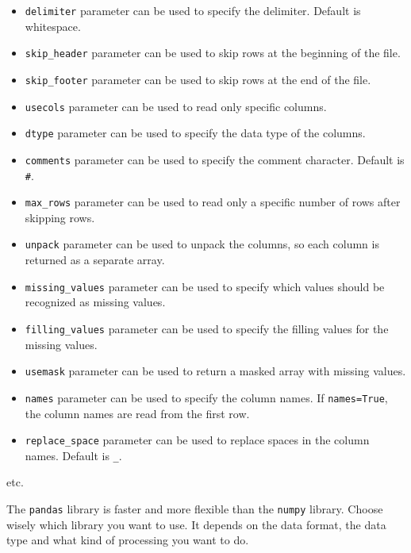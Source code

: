 \documentclass[
  letterpaper,
  DIV=11,
  numbers=noendperiod]{scrreprt}
\begin{document}
\begin{itemize}
\item
  \texttt{delimiter} parameter can be used to specify the delimiter.
  Default is whitespace.
\item
  \texttt{skip\_header} parameter can be used to skip rows at the
  beginning of the file.
\item
  \texttt{skip\_footer} parameter can be used to skip rows at the end of
  the file.
\item
  \texttt{usecols} parameter can be used to read only specific columns.
\item
  \texttt{dtype} parameter can be used to specify the data type of the
  columns.
\item
  \texttt{comments} parameter can be used to specify the comment
  character. Default is \texttt{\#}.
\item
  \texttt{max\_rows} parameter can be used to read only a specific
  number of rows after skipping rows.
\item
  \texttt{unpack} parameter can be used to unpack the columns, so each
  column is returned as a separate array.
\item
  \texttt{missing\_values} parameter can be used to specify which values
  should be recognized as missing values.
\item
  \texttt{filling\_values} parameter can be used to specify the filling
  values for the missing values.
\item
  \texttt{usemask} parameter can be used to return a masked array with
  missing values.
\item
  \texttt{names} parameter can be used to specify the column names. If
  \texttt{names=True}, the column names are read from the first row.
\item
  \texttt{replace\_space} parameter can be used to replace spaces in the
  column names. Default is \texttt{\_}.
\end{itemize}

etc.

\begin{tcolorbox}[enhanced jigsaw, leftrule=.75mm, bottomrule=.15mm, colbacktitle=quarto-callout-important-color!10!white, title=\textcolor{quarto-callout-important-color}{\faExclamation}\hspace{0.5em}{Important}, breakable, arc=.35mm, toptitle=1mm, opacityback=0, titlerule=0mm, coltitle=black, colback=white, opacitybacktitle=0.6, colframe=quarto-callout-important-color-frame, left=2mm, rightrule=.15mm, toprule=.15mm, bottomtitle=1mm]

The \texttt{pandas} library is faster and more flexible than the
\texttt{numpy} library. Choose wisely which library you want to use. It
depends on the data format, the data type and what kind of processing
you want to do.

\end{tcolorbox}
\end{document}
